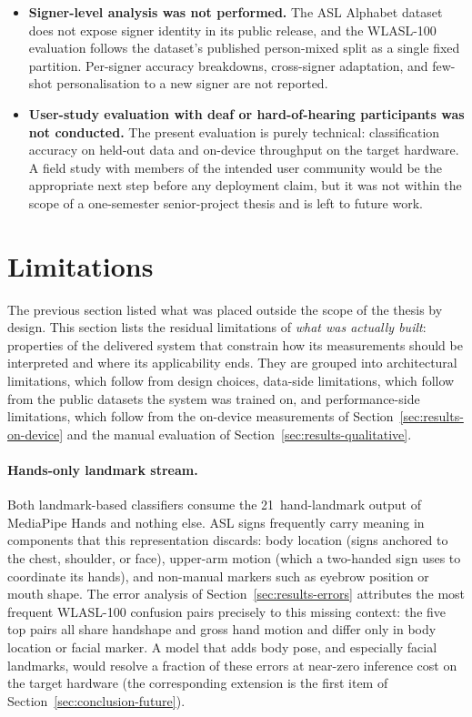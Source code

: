 \begin{itemize}
        common in commercial accessibility tools, is therefore not
        part of the deliverable.
  \item \textbf{Signer-level analysis was not performed.}
        The ASL Alphabet dataset does not expose signer identity in
        its public release, and the WLASL-100 evaluation follows
        the dataset's published person-mixed split as a single
        fixed partition. Per-signer accuracy breakdowns,
        cross-signer adaptation, and few-shot personalisation to a
        new signer are not reported.
  \item \textbf{User-study evaluation with deaf or
        hard-of-hearing participants was not conducted.} The
        present evaluation is purely technical: classification
        accuracy on held-out data and on-device throughput on the
        target hardware. A field study with members of the
        intended user community would be the appropriate next step
        before any deployment claim, but it was not within the
        scope of a one-semester senior-project thesis and is left
        to future work.
\end{itemize}

\section{Limitations}
\label{sec:conclusion-limitations}

The previous section listed what was placed outside the scope of
the thesis by design. This section lists the residual limitations
of \emph{what was actually built}: properties of the delivered
system that constrain how its measurements should be interpreted
and where its applicability ends. They are grouped into
architectural limitations, which follow from design choices,
data-side limitations, which follow from the public datasets the
system was trained on, and performance-side limitations, which
follow from the on-device measurements of
Section~\ref{sec:results-on-device} and the manual evaluation of
Section~\ref{sec:results-qualitative}.

\paragraph{Hands-only landmark stream.}
Both landmark-based classifiers consume the 21~hand-landmark
output of MediaPipe Hands and nothing else. ASL signs frequently
carry meaning in components that this representation discards:
body location (signs anchored to the chest, shoulder, or face),
upper-arm motion (which a two-handed sign uses to coordinate its
hands), and non-manual markers such as eyebrow position or mouth
shape. The error analysis of
Section~\ref{sec:results-errors} attributes the most frequent
WLASL-100 confusion pairs precisely to this missing context: the
five top pairs all share handshape and gross hand motion and
differ only in body location or facial marker. A model that adds
body pose, and especially facial landmarks, would resolve a
fraction of these errors at near-zero inference cost on the
target hardware (the corresponding extension is the first item of
Section~\ref{sec:conclusion-future}).

